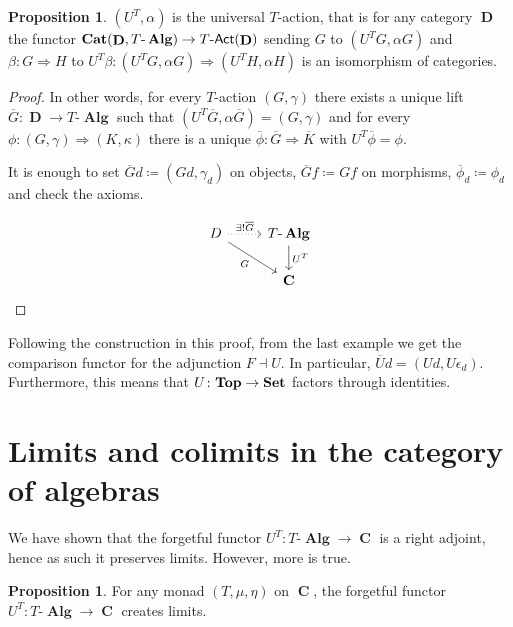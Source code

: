 \documentclass[a4paper,11pt,twoside, openany]{book}
\newcommand{\catname}[1]{{\normalfont\textbf{#1}}}
\DeclareMathOperator{\Alg}{\mathbf{Alg}}
\newcommand{\Set}{\catname{Set}}
\newcommand{\Top}{\catname{Top}}
\newcommand{\Cat}{\catname{Cat}}
\DeclareMathOperator{\C}{\mathbf{C}}
\DeclareMathOperator{\D}{\mathbf{D}}
\theoremstyle{definition}
\theoremstyle{definition}
\newtheorem{prop}[thm]{Proposition}
\theoremstyle{remark}
\begin{document}
\begin{prop}
	$(U^T,\alpha)$ is the universal $T$-action, that is for any category $\D$ the functor $\Cat(\D,T\mbox{-}\Alg)\rightarrow T\mbox{-}\mathsf{Act}(\D)$ sending $G$ to $(U^TG,\alpha G)$ and $\beta\colon G\Rightarrow H$ to $U^T\beta\colon(U^TG,\alpha G)\Rightarrow (U^TH,\alpha H)$ is an isomorphism of categories.
\end{prop}

\begin{proof}
	In other words, for every $T$-action $(G,\gamma)$ there exists a unique lift $\overline{G}\colon\D\rightarrow T\mbox{-}\Alg$ such that $(U^T\overline{G},\alpha\overline{G})=(G,\gamma)$ and for every $\phi\colon(G,\gamma)\Rightarrow (K,\kappa)$ there is a unique $\overline{\phi}\colon\overline{G}\Rightarrow\overline{K}$ with $U^T\overline{\phi}=\phi$.
	
	It is enough to set $\overline{G}d\coloneqq(Gd,\gamma_d)$ on objects, $\overline{G}f\coloneqq Gf$ on morphisms, $\overline{\phi}_d\coloneqq\phi_d$ and check the axioms.
	
	\[
		\begin{tikzcd}
			D\ar[r, dotted, "\exists!\overline{G}"]\ar[dr, swap, "G"]
			& T\mbox{-}\Alg\ar[d, "U^T"] \\
			& \C
		\end{tikzcd}    
	\]			\qedhere
\end{proof}

Following the construction in this proof, from the last example we get the comparison functor for the adjunction $F\dashv U$. In particular, $\overline{U}d=(Ud,U\epsilon_d)$. Furthermore, this means that $U\colon\Top\rightarrow\Set$ factors through identities.


\section{Limits and colimits in the category of algebras}

We have shown that the forgetful functor $U^T\colon T\mbox{-}\Alg\rightarrow\C$ is a right adjoint, hence as such it preserves limits. However, more is true.

\begin{prop}\label{create lims}
	For any monad $(T,\mu,\eta)$ on $\C$, the forgetful functor $U^T\colon T\mbox{-}\Alg\rightarrow\C$ creates limits.
\end{prop}
\end{document}
